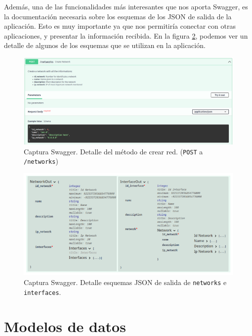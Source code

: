 \documentclass[a4paper, oneside, 12pt]{book}
\begin{document}
	\noindent Además, una de las funcionalidades más interesantes que nos aporta Swagger, es la documentación necesaria sobre los esquemas de los JSON de salida de la aplicación. Esto es muy importante ya que nos permitiría conectar con otras aplicaciones, y presentar la información recibida. En la figura \ref{img: swagger schemas 1}, podemos ver un detalle de algunos de los esquemas que se utilizan en la aplicación.
	
	\pagebreak
	
	\begin{figure}[h!]
		\includegraphics[width=1.2\textwidth, center]{img/swagger_2.png}
		\caption{Captura Swagger. Detalle del método de crear red. (\texttt{POST} a \texttt{/networks})}
		\label{img: swagger 2}
	\end{figure}

	\begin{figure}[h!]
		\includegraphics[width=1.2\textwidth, center]{img/swagger_schemas_1.png}
		\caption{Captura Swagger. Detalle esquemas JSON de salida de \texttt{networks} e \texttt{interfaces}.}
		\label{img: swagger schemas 1}
	\end{figure}
	
	
	\pagebreak
	
	\section{Modelos de datos}
	
\end{document}
